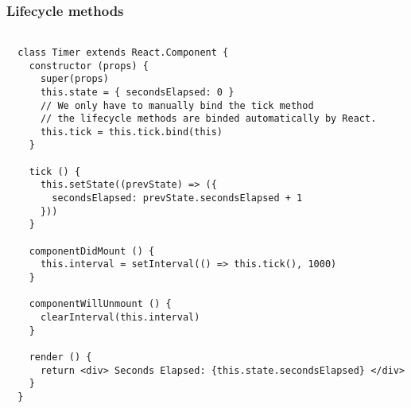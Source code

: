 \begin{frame}[fragile]

  \frametitle{Lifecycle methods}

  \begin{verbatim}

  class Timer extends React.Component {
    constructor (props) {
      super(props)
      this.state = { secondsElapsed: 0 }
      // We only have to manually bind the tick method
      // the lifecycle methods are binded automatically by React.
      this.tick = this.tick.bind(this)
    }

    tick () {
      this.setState((prevState) => ({
        secondsElapsed: prevState.secondsElapsed + 1
      }))
    }

    componentDidMount () {
      this.interval = setInterval(() => this.tick(), 1000)
    }

    componentWillUnmount () {
      clearInterval(this.interval)
    }

    render () {
      return <div> Seconds Elapsed: {this.state.secondsElapsed} </div>
    }
  }

  \end{verbatim}

\end{frame}

